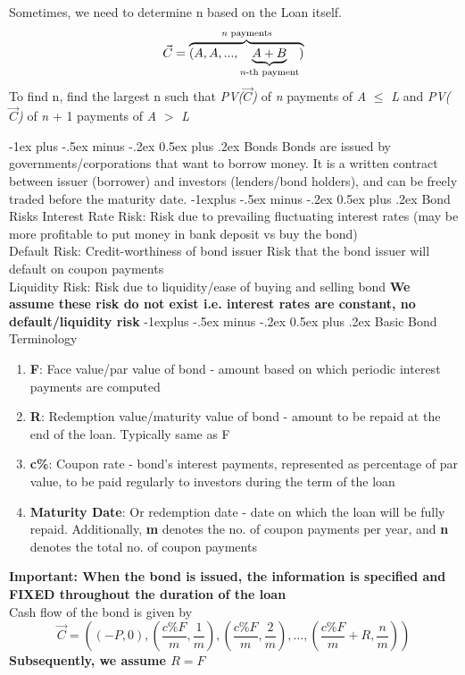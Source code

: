 \documentclass[10pt,landscape]{article}
\makeatletter
\renewcommand{\section}{\@startsection{section}{1}{0mm}%
                                {-1ex plus -.5ex minus -.2ex}%
                                {0.5ex plus .2ex}%
                                {\normalfont\large\bfseries}}
\renewcommand{\subsection}{\@startsection{subsection}{2}{0mm}%
                                {-1explus -.5ex minus -.2ex}%
                                {0.5ex plus .2ex}%
                                {\normalfont\normalsize\bfseries}}
\makeatother
\begin{document}
\begin{multicols}{3}
Sometimes, we need to determine n based on the Loan itself. 
\[\Vec{C} = \overbrace{(A, A, ..., \underbrace{A+B}_\text{\emph{n}-th payment})}^\text{\emph{n} payments} \]
To find n, find the largest n such that \emph{PV($\Vec{C}$)} of \emph{n} payments of \emph{A} $\leq$ \emph{L} and \emph{PV($\Vec{C}$)} of \emph{n} + 1 payments of \emph{A} $>$ \emph{L}

\section{Bonds}
Bonds are issued by governments/corporations that want to borrow money. It is a written contract between issuer (borrower) and investors (lenders/bond holders), and can be freely traded before the maturity date.
\subsection{Bond Risks}
Interest Rate Risk: Risk due to prevailing fluctuating interest rates (may be more profitable to put money in bank deposit vs buy the bond)\\
Default Risk: Credit-worthiness of bond issuer Risk that the bond issuer will default on coupon payments\\
Liquidity Risk: Risk due to liquidity/ease of buying and selling bond
\textbf{We assume these risk do not exist i.e. interest rates are constant, no default/liquidity risk}
\subsection{Basic Bond Terminology}
\begin{enumerate}
    \item \textbf{F}: Face value/par value of bond - amount based on which periodic interest payments are computed
    \item \textbf{R}: Redemption value/maturity value of bond - amount to be repaid at the end of the loan. Typically same as F
    \item \textbf{c\%}: Coupon rate - bond's interest payments, represented as percentage of par value, to be paid regularly to investors during the term of the loan
    \item \textbf{Maturity Date}: Or redemption date - date on which the loan will be fully repaid. Additionally, \textbf{m} denotes the no. of coupon payments per year, and \textbf{n} denotes the total no. of coupon payments
\end{enumerate}
\textbf{Important: When the bond is issued, the information is specified and FIXED throughout the duration of the loan}\\
Cash flow of the bond is given by
\[\Vec{C}=\left((-P, 0), (\frac{c\%F}{m}, \frac{1}{m}),(\frac{c\%F}{m}, \frac{2}{m}),\dotsc, (\frac{c\%F}{m}+R, \frac{n}{m})\right)\]
\textbf{Subsequently, we assume $R=F$}

\end{multicols}
\end{document}
